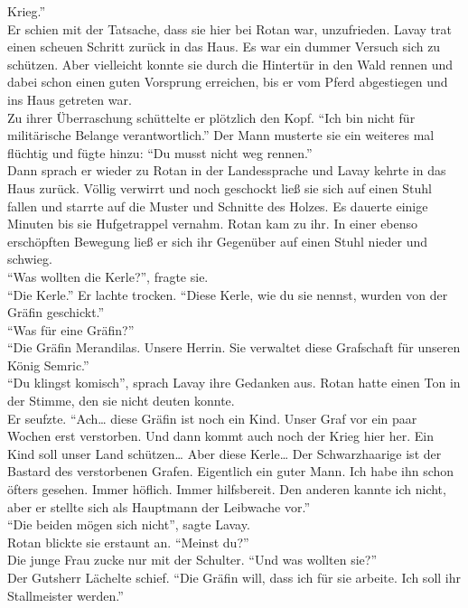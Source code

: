 Krieg.''\\
Er schien mit der Tatsache, dass sie hier bei Rotan war, unzufrieden. Lavay trat einen scheuen 
Schritt zurück in das Haus. Es war ein dummer Versuch sich zu schützen. Aber vielleicht konnte sie 
durch die Hintertür in den Wald rennen und dabei schon einen guten Vorsprung erreichen, bis er vom 
Pferd abgestiegen und ins Haus getreten war.\\
Zu ihrer Überraschung schüttelte er plötzlich den Kopf. ``Ich bin nicht für militärische Belange 
verantwortlich.'' Der Mann musterte sie ein weiteres mal flüchtig und fügte hinzu: ``Du musst nicht 
weg rennen.''\\
Dann sprach er wieder zu Rotan in der Landessprache und Lavay kehrte in das Haus zurück. Völlig 
verwirrt und noch geschockt ließ sie sich auf einen Stuhl fallen und starrte auf die Muster und 
Schnitte des Holzes. Es dauerte einige Minuten bis sie Hufgetrappel vernahm. Rotan kam zu ihr. In 
einer ebenso erschöpften Bewegung ließ er sich ihr Gegenüber auf einen Stuhl nieder und schwieg. \\
``Was wollten die Kerle?'', fragte sie.\\
``Die Kerle.'' Er lachte trocken. ``Diese Kerle, wie du sie nennst, wurden von der Gräfin 
geschickt.''\\
``Was für eine Gräfin?''\\
``Die Gräfin Merandilas. Unsere Herrin. Sie verwaltet diese Grafschaft für unseren König Semric.''\\
``Du klingst komisch'', sprach Lavay ihre Gedanken aus. Rotan hatte einen Ton in der Stimme, den 
sie nicht deuten konnte.\\
Er seufzte. ``Ach… diese Gräfin ist noch ein Kind. Unser Graf vor ein paar Wochen erst verstorben. 
Und dann kommt auch noch der Krieg hier her. Ein Kind soll unser Land schützen… Aber diese Kerle… 
Der Schwarzhaarige ist der Bastard des verstorbenen Grafen. Eigentlich ein guter Mann. Ich habe ihn 
schon öfters gesehen. Immer höflich. Immer hilfsbereit. Den anderen kannte ich nicht, aber er 
stellte sich als Hauptmann der Leibwache vor.''\\
``Die beiden mögen sich nicht'', sagte Lavay.\\
Rotan blickte sie erstaunt an. ``Meinst du?''\\
Die junge Frau zucke nur mit der Schulter. ``Und was wollten sie?''\\
Der Gutsherr Lächelte schief. ``Die Gräfin will, dass ich für sie arbeite. Ich soll ihr 
Stallmeister werden.''\\
